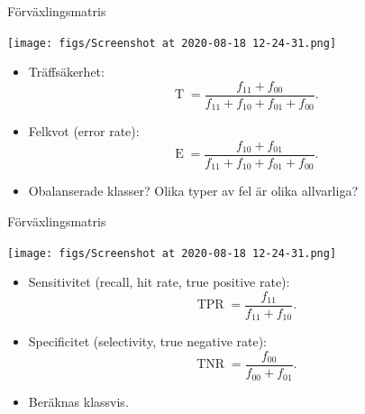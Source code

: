 \documentclass[10pt,english]{beamer}
\begin{document}
\begin{frame}{Förväxlingsmatris}
\begin{center}
    \texttt{[image: figs/Screenshot at 2020-08-18 12-24-31.png]}
\end{center}

\begin{itemize}
    \item Träffsäkerhet:
    \begin{equation*}
        \operatorname{T} = \frac{f_{11} + f_{00}}{f_{11} + f_{10} + f_{01} + f_{00}}.
    \end{equation*}
    \item Felkvot (error rate):
    \begin{equation*}
        \operatorname{E} = \frac{f_{10} + f_{01}}{f_{11} + f_{10} + f_{01} + f_{00}}.
    \end{equation*}
    \item Obalanserade klasser? Olika typer av fel är olika allvarliga?
\end{itemize}
    
\end{frame}

\begin{frame}{Förväxlingsmatris}
    \begin{center}
        \texttt{[image: figs/Screenshot at 2020-08-18 12-24-31.png]}
    \end{center}
    
    \begin{itemize}
        \item Sensitivitet (recall, hit rate, true positive rate):
        \begin{equation*}
            \operatorname{TPR} = \frac{f_{11} }{f_{11} + f_{10}}.
        \end{equation*}
        \item Specificitet (selectivity, true negative rate):
        \begin{equation*}
            \operatorname{TNR} = \frac{f_{00}}{f_{00} + f_{01}}.
        \end{equation*}
        \item Beräknas klassvis.
    \end{itemize}
        
\end{frame}
\end{document}
